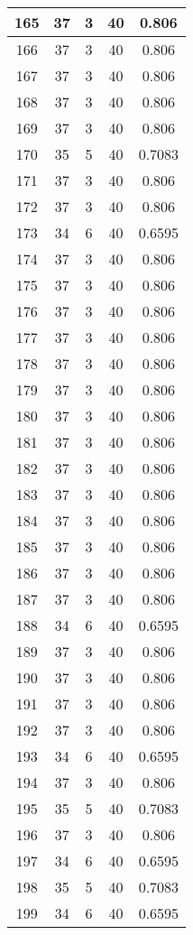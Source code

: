 \documentclass[letterpaper, 12pt]{article}
\begin{document}
\begin{longtable}{|c|c|c|c|c|}
\hline
165 & 37 & 3 & 40 & 0.806 \\
\hline
166 & 37 & 3 & 40 & 0.806 \\
\hline
167 & 37 & 3 & 40 & 0.806 \\
\hline
168 & 37 & 3 & 40 & 0.806 \\
\hline
169 & 37 & 3 & 40 & 0.806 \\
\hline
170 & 35 & 5 & 40 & 0.7083 \\
\hline
171 & 37 & 3 & 40 & 0.806 \\
\hline
172 & 37 & 3 & 40 & 0.806 \\
\hline
173 & 34 & 6 & 40 & 0.6595 \\
\hline
174 & 37 & 3 & 40 & 0.806 \\
\hline
175 & 37 & 3 & 40 & 0.806 \\
\hline
176 & 37 & 3 & 40 & 0.806 \\
\hline
177 & 37 & 3 & 40 & 0.806 \\
\hline
178 & 37 & 3 & 40 & 0.806 \\
\hline
179 & 37 & 3 & 40 & 0.806 \\
\hline
180 & 37 & 3 & 40 & 0.806 \\
\hline
181 & 37 & 3 & 40 & 0.806 \\
\hline
182 & 37 & 3 & 40 & 0.806 \\
\hline
183 & 37 & 3 & 40 & 0.806 \\
\hline
184 & 37 & 3 & 40 & 0.806 \\
\hline
185 & 37 & 3 & 40 & 0.806 \\
\hline
186 & 37 & 3 & 40 & 0.806 \\
\hline
187 & 37 & 3 & 40 & 0.806 \\
\hline
188 & 34 & 6 & 40 & 0.6595 \\
\hline
189 & 37 & 3 & 40 & 0.806 \\
\hline
190 & 37 & 3 & 40 & 0.806 \\
\hline
191 & 37 & 3 & 40 & 0.806 \\
\hline
192 & 37 & 3 & 40 & 0.806 \\
\hline
193 & 34 & 6 & 40 & 0.6595 \\
\hline
194 & 37 & 3 & 40 & 0.806 \\
\hline
195 & 35 & 5 & 40 & 0.7083 \\
\hline
196 & 37 & 3 & 40 & 0.806 \\
\hline
197 & 34 & 6 & 40 & 0.6595 \\
\hline
198 & 35 & 5 & 40 & 0.7083 \\
\hline
199 & 34 & 6 & 40 & 0.6595 \\
\hline
\end{longtable}
\end{document}
